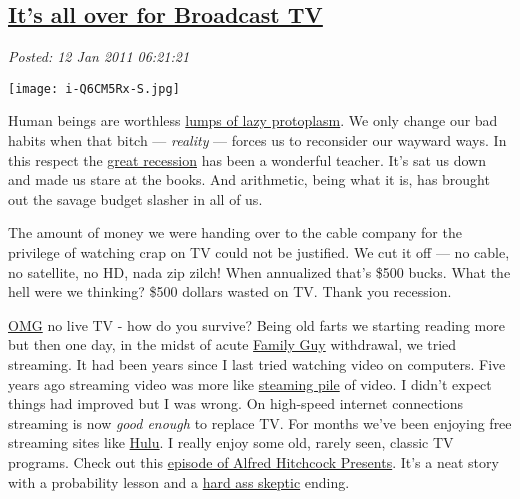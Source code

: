 %

\subsection*{\href{http://bakerjd99.wordpress.com/2011/01/12/its-all-over-for-broadcast-tv/}{It's all over for Broadcast TV}}


\noindent\emph{Posted: 12 Jan 2011 06:21:21}
\vspace{6pt}


\captionsetup[floatingfigure]{labelformat=empty}
\begin{floatingfigure}[l]{0.25\textwidth}
\centering
\texttt{[image: i-Q6CM5Rx-S.jpg]}
\label{fig:996X0}
\end{floatingfigure}Human
beings are worthless
\href{http://www.independent.ie/lifestyle/independent-woman/love-sex/why-do-successful-women-settle-for-lazy-lumps-1587083.html}{lumps
of lazy protoplasm}. We only change our bad habits when that bitch ---
\emph{reality} --- forces us to reconsider our wayward ways. In this
respect the
\href{http://www.theatlanticwire.com/opinions/view/opinion/It-Will-Take-Years-for-Your-Paycheck-to-Recover-From-the-Great-Recession-6523}{great
recession} has been a wonderful teacher. It's sat us down and made us
stare at the books. And arithmetic, being what it is, has brought out
the savage budget slasher in all of us.

The amount of money we were handing over to the cable company for the
privilege of watching crap on TV could not be justified. We cut it off
--- no cable, no satellite, no HD, nada zip zilch! When annualized
that's \$500 bucks. What the hell were we thinking? \$500 dollars wasted
on TV. Thank you recession.

\href{http://en.wikipedia.org/wiki/OMG\_They\_Killed\_Kenny}{OMG} no
live TV - how do you survive? Being old farts we starting reading more
but then one day, in the midst of acute
\href{http://www.hulu.com/family-guy}{Family Guy} withdrawal, we tried
streaming. It had been years since I last tried watching video on
computers. Five years ago streaming video was more like
\href{http://www.thebestpageintheuniverse.net/c.cgi?u=episode3}{steaming
pile} of video. I didn't expect things had improved but I was wrong. On
high-speed internet connections streaming is now \emph{good enough} to
replace TV. For months we've been enjoying free streaming sites like
\href{http://www.hulu.com/}{Hulu}. I really enjoy some old, rarely seen,
classic TV programs. Check out this
\href{http://www.hulu.com/embed/sp1x3wBXdMfrNzCrDGiIYg}{episode of
Alfred Hitchcock Presents}. It's a neat story with a probability lesson
and a
\href{http://bakerjd99.wordpress.com/2009/10/29/hard-ass-skeptic-rules/}{hard
ass skeptic} ending.



%